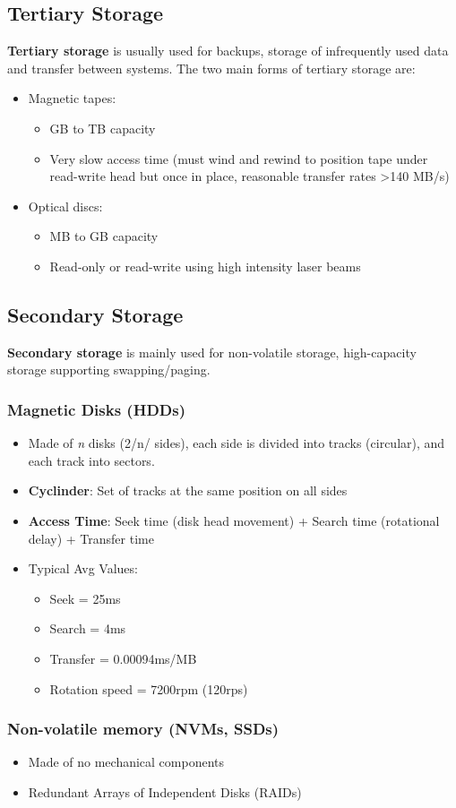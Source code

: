 \documentclass[11pt]{article}
\begin{document}
\subsection{Tertiary Storage}
\label{sec:org0711805}
\textbf{Tertiary storage} is usually used for backups, storage of infrequently used data and transfer between systems.
The two main forms of tertiary storage are:
\begin{itemize}
\item Magnetic tapes:
\begin{itemize}
\item GB to TB capacity
\item Very slow access time (must wind and rewind to position tape under read-write head but once in place, reasonable transfer rates >140 MB/s)
\end{itemize}
\item Optical discs:
\begin{itemize}
\item MB to GB capacity
\item Read-only or read-write using high intensity laser beams
\end{itemize}
\end{itemize}
\subsection{Secondary Storage}
\label{sec:org3467f11}
\textbf{Secondary storage} is mainly used for non-volatile storage, high-capacity storage supporting swapping/paging.
\subsubsection{Magnetic Disks (HDDs)}
\label{sec:orgdc36f3f}
\begin{itemize}
\item Made of \emph{n} disks (2/n/ sides), each side is divided into tracks (circular), and each track into sectors.
\item \textbf{Cyclinder}: Set of tracks at the same position on all sides
\item \textbf{Access Time}: Seek time (disk head movement) + Search time (rotational delay) + Transfer time
\item Typical Avg Values: 
\begin{itemize}
\item Seek = 25ms
\item Search = 4ms
\item Transfer = 0.00094ms/MB
\item Rotation speed = 7200rpm (120rps)
\end{itemize}
\end{itemize}

\subsubsection{Non-volatile memory (NVMs, SSDs)}
\label{sec:orga6cbdc5}
\begin{itemize}
\item Made of no mechanical components
\item Redundant Arrays of Independent Disks (RAIDs)
\end{itemize}
\end{document}
